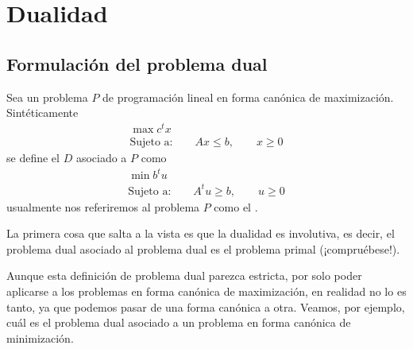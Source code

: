 \chapter{Dualidad}
\label{dual}
\section{Formulación del problema dual}
Sea un problema $P$ de programación lineal en forma canónica de maximización. Sintéticamente
\begin{equation*}
	\begin{array}{c}
		\max c^tx\\
		\text{Sujeto a:}\qquad Ax\leq b,\qquad x\geq 0
	\end{array}
\end{equation*}
se define el  $D$ asociado a $P$ como
\begin{equation*}
	\begin{array}{c}
		\min b^tu\\
		\text{Sujeto a:}\qquad A^tu\geq b,\qquad u\geq 0
	\end{array}
\end{equation*}
usualmente nos referiremos al problema $P$ como el .
\begin{obs}[Involutividad]
	La primera cosa que salta a la vista es que la dualidad es involutiva, es decir, el problema dual asociado al problema dual es el problema primal (¡compruébese!).
\end{obs}
Aunque esta definición de problema dual parezca estricta, por solo poder aplicarse a los problemas en forma canónica de maximización, en realidad no lo es tanto, ya que podemos pasar de una forma canónica a otra. Veamos, por ejemplo, cuál es el problema dual asociado a un problema en forma canónica de minimización.
